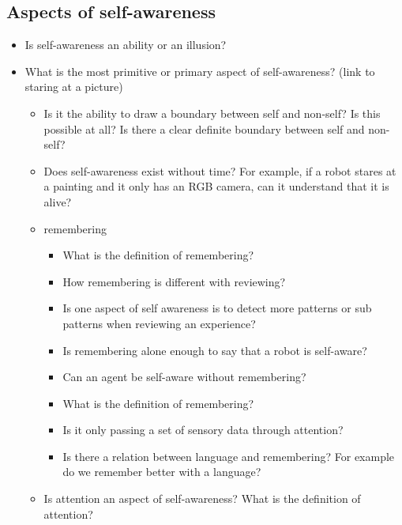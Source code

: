     \subsection{Aspects of self-awareness}
    \begin{itemize}
        \item Is self-awareness an ability or an illusion? 
    \end{itemize}
    \begin{itemize}
        \item What is the most primitive or primary aspect of self-awareness? (link to staring at a picture)
        \begin{itemize}
            \item Is it the ability to draw a boundary between self and non-self? Is this possible at all? Is there a clear definite boundary between self and non-self?
        \end{itemize}
        \begin{itemize}
            \item Does self-awareness exist without time? For example, if a robot stares at a painting and it only has an RGB camera, can it understand that it is alive?
            \item remembering
            \begin{itemize}
                \item What is the definition of remembering?
                \item How remembering is different with reviewing?
                \item Is one aspect of self awareness is to detect more patterns or sub patterns when reviewing an experience?
            \end{itemize}
            \begin{itemize}
                \item Is remembering alone enough to say that a robot is self-aware? 
                \item Can an agent be self-aware without remembering? 
                \item What is the definition of remembering? 
                \item Is it only passing a set of sensory data through attention?
                \item Is there a relation between language and remembering? For example do we remember better with a language?
            \end{itemize}
            \item Is attention an aspect of self-awareness? What is the definition of attention?
        \end{itemize}
    \end{itemize}
